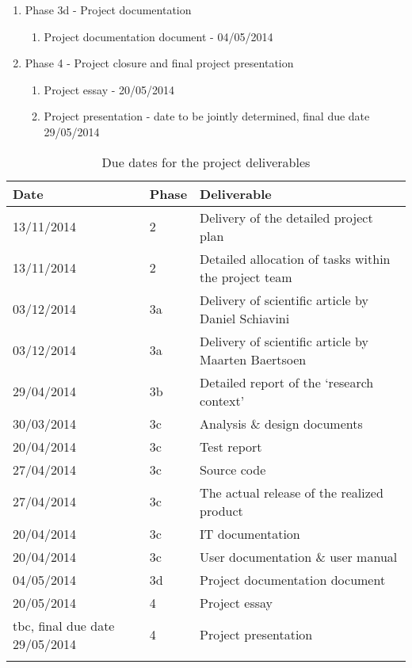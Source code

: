\begin{enumerate}
 	\item Phase 3d - Project documentation
 	\begin{enumerate}
		\item Project documentation document				- 	04/05/2014
	\end {enumerate}
	\item Phase 4 - Project closure and final project presentation
 	\begin{enumerate}
		\item Project essay							- 	20/05/2014
		\item Project presentation						- 	date to be jointly determined, final due date 29/05/2014
	\end {enumerate}
\end {enumerate}

\begin{center}
    \begin{longtable}{ | p{3cm} | l |  p{7cm} |}
    \hline
    	\textbf{Date} & \textbf{Phase} & \textbf{Deliverable} \\ 
    	\endhead
    \hline
    	13/11/2014 & 2 & Delivery of the detailed project plan \\ 
    \hline
    	13/11/2014 & 2 & Detailed allocation of tasks within the project team \\ 
    \hline
    	03/12/2014 & 3a & Delivery of scientific article by Daniel Schiavini \\ 
    \hline
    	03/12/2014 & 3a & Delivery of scientific article by Maarten Baertsoen \\ 
    \hline
    	29/04/2014 & 3b & Detailed report of the `research context'  \\ 
    \hline
  	 30/03/2014 & 3c & Analysis \& design documents \\ 
    \hline
   	20/04/2014 & 3c & Test report \\ 
    \hline
  	27/04/2014 & 3c & Source code \\ 
    \hline
  	27/04/2014 & 3c & The actual release of the realized product \\ 
    \hline
  	20/04/2014 & 3c &  IT documentation   \\ 
    \hline
  	20/04/2014 & 3c & User documentation \& user manual  \\ 
    \hline
  	04/05/2014 & 3d & Project documentation document \\ 
    \hline
  	20/05/2014 & 4 & Project essay \\ 
    \hline
	\dict{TBC}{To be confirmed}%
 	tbc, final due date 29/05/2014 & 4 & Project presentation	 \\ 
    \hline
    \caption{Due dates for the project deliverables}
    \label{tab:deliverables}
    \end{longtable}
\end{center}

